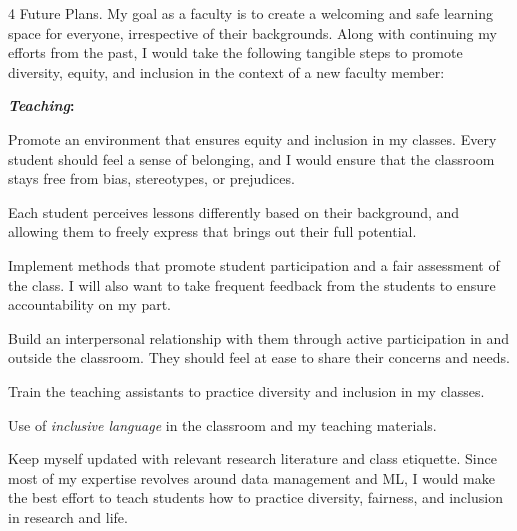 \documentclass[10pt]{article}
\makeatletter
\def \paragraph {%
    \@startsection{paragraph}%
        {4}%
        \z@\z@{-\fontdimen 6 \font}%
        {\large \scshape \bfseries}%
    }
\newcommand*\heading[1]{\textbf{\textit{#1}:}}
\makeatother
\begin{document}
\paragraph{Future Plans.}
My goal as a faculty is to create a welcoming and safe learning space for everyone, irrespective of their backgrounds. Along with continuing my efforts from the past, I would take the following tangible steps to promote diversity, equity,	and	inclusion in the	context of a new faculty member:

\ifdefined\ApplicationType
    
\else
\fi

\heading{Teaching}
\begin{enumerate*}[leftmargin=*, noitemsep, topsep=0pt, label=(\arabic*)]
    \item Promote an environment that ensures equity and inclusion in my classes. Every student should feel a sense of belonging, and I would ensure that the classroom stays free from bias, stereotypes, or prejudices. 
    \item Each student perceives lessons differently based on their background, and allowing them to freely express that brings out their full potential.
    \item Implement methods that promote student participation and a fair assessment of the class. I will also want to take frequent feedback from the students to ensure accountability on my part.
    \item Build an interpersonal relationship with them through active participation in and outside the classroom. They should feel at ease to share their concerns and needs.
    \item Train the teaching assistants to practice diversity and inclusion in my classes.
    \item Use of \textit{inclusive language} in the classroom and my teaching materials.
    \item Keep myself updated with relevant research literature and class etiquette. Since most of my expertise revolves around data management and ML, I would make the best effort to teach students how to practice diversity, fairness, and inclusion in research and life.
\end{enumerate*}
\end{document}
